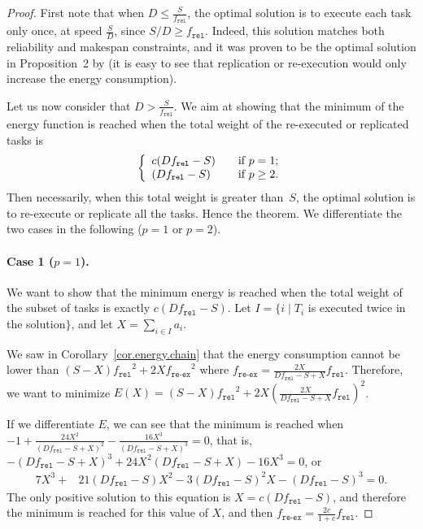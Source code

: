 \documentclass[a4paper]{article}
\theoremstyle{plain}
\theoremstyle{definition}
\theoremstyle{remark}
\newcommand{\fr}{\ensuremath{f_{\texttt{rel}}}\xspace}
\newcommand{\freex}{\ensuremath{f_{\texttt{re-ex}}}\xspace}
\begin{document}
\begin{proof}
  First note that when $D \leq \frac{S}{\fr}$, the optimal solution is
  to execute each task only once, at speed $\frac{S}{D}$, since $S/D
  \geq \fr$. Indeed, this solution matches both reliability and
  makespan constraints, and it was proven to be the optimal solution
  in Proposition~2 by \cite{aupy12ccpe} (it is easy to see that
  replication or re-execution would only increase the energy
  consumption).

  Let us now consider that $D>\frac{S}{\fr}$. We aim at showing
  that the minimum of the energy function is reached when the total
  weight of the re-executed or replicated tasks is
\[
\left\{
  \begin{array}{l l}
     c(D\fr - S)   & \quad \text{if $p=1$};\\
     (D\fr- S)     &  \quad \text{if $p\geq 2$}.\\
  \end{array} \right.
\]
Then necessarily, when this total weight is greater than~$S$, the
optimal solution is to re-execute or replicate all the tasks. Hence
the theorem. We differentiate the two cases in the following ($p=1$ or
$p=2$).

\paragraph{Case 1 ($p=1$). }
We want to show that the minimum energy is reached when the total
weight of the subset of tasks is exactly $c(D\fr -S)$. Let $I=\{i\;
|\; T_i$ is executed twice in the solution$\}$, and let
$X=\sum_{i\in I}a_i$.

We saw in Corollary~\ref{cor.energy.chain} that the energy consumption
cannot be lower than $(S-X)\fr^2 + 2X \freex^2$ where $\freex =
\frac{2X}{D\fr-S+X}\fr$.  Therefore, we want to minimize $E(X) =
(S-X)\fr^2 + 2X \left( \frac{2X}{D\fr-S+X}\fr \right)^2$.

If we differentiate $E$, we can see that the minimum is reached when 
$-1 + \frac{24X^2}{(D\fr - S + X)^2} - \frac{16X^3}{(D\fr - S + X)^3}
= 0$,
 that is, 
 $-(D\fr - S + X)^3 + 24X^2(D\fr - S + X) - 16X^3 = 0$, or 
\begin{align*}
7X^3 +& 21(D\fr -S)X^2  - 3(D\fr -S)^2X -(D\fr -S)^3 = 0.
\end{align*} 
The only positive solution to this equation is $X = c(D\fr -S)$, and
therefore the minimum is reached for this value of $X$, and
then $\freex=\frac{2c}{1+c}\fr$. 


\end{proof}
\end{document}
